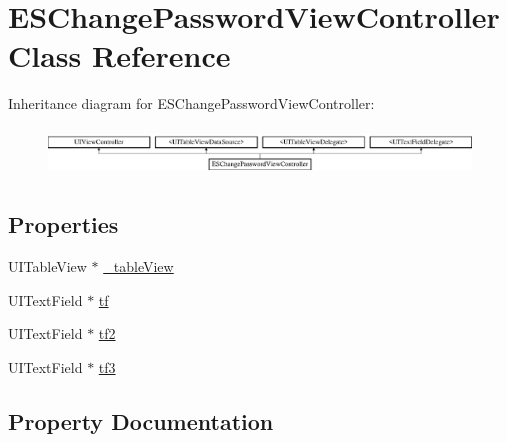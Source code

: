 \hypertarget{interface_e_s_change_password_view_controller}{}\section{E\+S\+Change\+Password\+View\+Controller Class Reference}
\label{interface_e_s_change_password_view_controller}
Inheritance diagram for E\+S\+Change\+Password\+View\+Controller\+:\begin{figure}[H]
\begin{center}
\leavevmode
\includegraphics[height=1.278539cm]{interface_e_s_change_password_view_controller}
\end{center}
\end{figure}
\subsection*{Properties}
\begin{DoxyCompactItemize}
\item 
U\+I\+Table\+View $\ast$ \hyperlink{interface_e_s_change_password_view_controller_abae47b25e62671a31a24d64c97e40896}{\+\_\+table\+View}
\item 
U\+I\+Text\+Field $\ast$ \hyperlink{interface_e_s_change_password_view_controller_a034d51b287c59b9fbd13a171cf0f286d}{tf}
\item 
U\+I\+Text\+Field $\ast$ \hyperlink{interface_e_s_change_password_view_controller_a07b13e9c8273f5657e8c436df9d1e5d3}{tf2}
\item 
U\+I\+Text\+Field $\ast$ \hyperlink{interface_e_s_change_password_view_controller_a484172c229b1909866c9260d5102d4b2}{tf3}
\end{DoxyCompactItemize}


\subsection{Property Documentation}
\hypertarget{interface_e_s_change_password_view_controller_abae47b25e62671a31a24d64c97e40896}{}

